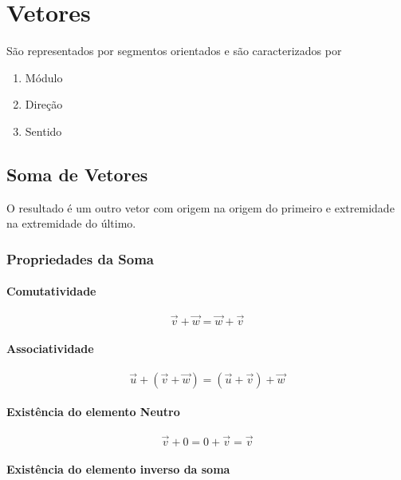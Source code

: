 \section{Vetores}\label{vetores}

São representados por segmentos orientados e são caracterizados por

\begin{enumerate}
\def\labelenumi{\arabic{enumi}.}
\itemsep1pt\parskip0pt
\item
  Módulo
\item
  Direção
\item
  Sentido
\end{enumerate}

\subsection{Soma de Vetores}\label{soma-de-vetores}

O resultado é um outro vetor com origem na origem do primeiro e
extremidade na extremidade do último.

\subsubsection{Propriedades da Soma}\label{propriedades-da-soma}

\paragraph{Comutatividade}\label{comutatividade}

\[
\vec{v} + \vec{w} = \vec{w} + \vec{v}
\]

\paragraph{Associatividade}\label{associatividade}

\[
\vec{u} + (\vec{v} + \vec{w}) = (\vec{u} + \vec{v}) + \vec{w}
\]

\paragraph{Existência do elemento
Neutro}\label{existuxeancia-do-elemento-neutro}

\[
\vec{v} + 0 = 0 + \vec{v} = \vec{v}
\]

\paragraph{Existência do elemento inverso da
soma}\label{existuxeancia-do-elemento-inverso-da-soma}

